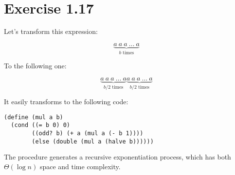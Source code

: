 \section*{Exercise 1.17}

\newcommand{\atimes}{a\ a\ a\ \dots\ a}

Let's transform this expression:

\[
\underbrace{\atimes}_\text{$b$ times}
\]

To the following one:

\[
\underbrace{\atimes}_\text{$b / 2$ times} \underbrace{\atimes}_\text{$b / 2$ times}
\]

It easily transforms to the following code:

\begin{verbatim}
(define (mul a b)
  (cond ((= b 0) 0)
        ((odd? b) (+ a (mul a (- b 1))))
        (else (double (mul a (halve b))))))
\end{verbatim}

The procedure generates a recursive exponentiation process, which has both $\Theta(\log n)$ space and time complexity.